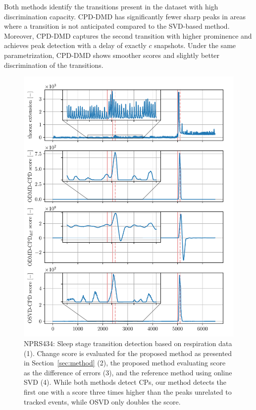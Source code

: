 Both methods identify the transitions present in the dataset with high discrimination capacity. CPD-DMD has significantly fewer sharp peaks in areas where a transition is not anticipated compared to the SVD-based method. Moreover, CPD-DMD captures the second transition with higher prominence and achieves peak detection with a delay of exactly \(c\) snapshots. Under the same parametrization, CPD-DMD shows smoother scores and slightly better discrimination of the transitions.

\begin{figure}[H]
	\centering
	\includegraphics[width=\linewidth]{figures/nprs44-chd_r2-roll_301-dmd_w1.0-h80.pdf}
	\caption{NPRS434: Sleep stage transition detection based on respiration data (1). Change score is evaluated for the proposed method as presented in Section~\ref{sec:method} (2), the proposed method evaluating score as the difference of errors (3), and the reference method using online SVD (4). While both methods detect CPs, our method detects the first one with a score three times higher than the peaks unrelated to tracked events, while OSVD only doubles the score.}\label{fig:nprs44}
\end{figure}

